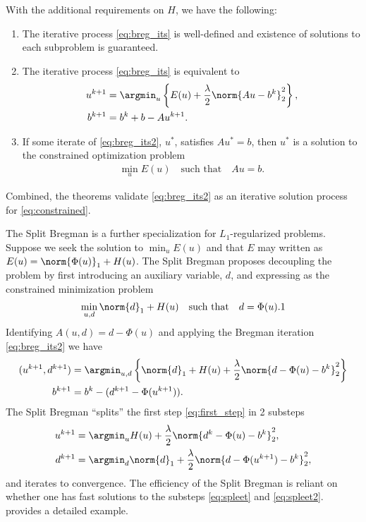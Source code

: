 \begin{thm}
	With the additional requirements on $H$, we have the following:
	\begin{enumerate}
		\item The iterative process \eqref{eq:breg_its} is well-defined and existence of solutions to each subproblem is guaranteed.
		
		\item The iterative process \eqref{eq:breg_its} is equivalent to
		\begin{align}
		\begin{split} 
		u^{k+1} &= \argmin_u \left\{ 
		E(u) + \frac{\lambda}{2} \norm{A u - b^k}^2_2
		\right\},
		\\
		b^{k+1} &= b^k + b - Au^{k+1}.
		\end{split}
		\label{eq:breg_its2}
		\end{align}
		
		\item If some iterate of \eqref{eq:breg_its2}, $u^*$, satisfies $Au^* = b$, then $u^*$ is a solution to the constrained optimization problem 
		\begin{align}
		\min_u E(u) \quad\text{such that}\quad Au = b.
		\label{eq:constrained}
		\end{align}
	\end{enumerate}
\end{thm}
Combined, the theorems validate \eqref{eq:breg_its2} as an iterative solution process for \eqref{eq:constrained}.

The Split Bregman is a further specialization for $L_1$-regularized problems. Suppose we seek the solution to $\min_u E(u)$ and that $E$ may written as $E(u) = \norm{\Phi(u)}_1 + H(u)$. The Split Bregman proposes decoupling the problem by first introducing an auxiliary variable, $d$, and expressing as the constrained minimization problem 
\begin{align*}
\min_{u,d} \norm{ d}_1 + H(u)
\quad\text{such that}\quad d = \Phi(u). 1
\end{align*}
Identifying $A(u,d) = d - \Phi(u)$ and applying the Bregman iteration \eqref{eq:breg_its2} we have 
\begin{align}
(u^{k+1}, d^{k+1}) &= \argmin_{u,d} \left\{
\norm{d}_1 + H(u) + \frac{\lambda}{2}\norm{d - \Phi(u) - b^k}^2_2 
\right\}
\label{eq:first_step}
\\ 
b^{k+1} 
&= b^k - (d^{k+1} - \Phi(u^{k+1})).
\end{align}
The Split Bregman ``splits'' the first step \eqref{eq:first_step} in 2 substeps
\begin{align}
u^{k+1} &= \argmin_u H(u) + \frac{\lambda}{2} \norm{d^k - \Phi(u) - b^k}^2_2 ,
\label{eq:spleet}
\\
d^{k+1} &= \argmin_d \norm{d}_1 + \frac{\lambda}{2} \norm{d - \Phi(u^{k+1}) - b^k}^2_2, 
\label{eq:spleet2}
\end{align}
and iterates to convergence. The efficiency of the Split Bregman is reliant on whether one has fast solutions to the substeps \eqref{eq:spleet} and \eqref{eq:spleet2}.  provides a detailed example.


